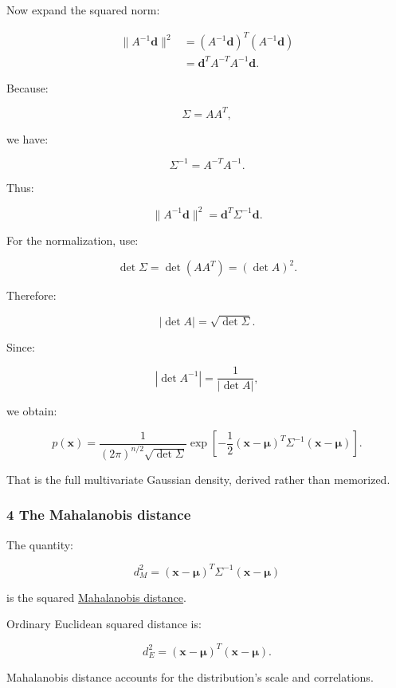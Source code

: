Now expand the squared norm:

\[
 \begin{aligned} \|A^{-1}\mathbf d\|^2 &=(A^{-1}\mathbf d)^T(A^{-1}\mathbf d)\\ &=\mathbf d^TA^{-T}A^{-1}\mathbf d. \end{aligned}
\]

Because:

\[
 \Sigma=AA^T,
\]

we have:

\[
 \Sigma^{-1}=A^{-T}A^{-1}.
\]

Thus:

\[
 \|A^{-1}\mathbf d\|^2 = \mathbf d^T\Sigma^{-1}\mathbf d.
\]

For the normalization, use:

\[
 \det\Sigma= \det(AA^T) =(\det A)^2.
\]

Therefore:

\[
 |\det A|=\sqrt{\det\Sigma}.
\]

Since:

\[
 |\det A^{-1}|=\frac1{|\det A|},
\]

we obtain:

\[
 \boxed{ p(\mathbf x)= \frac1{(2\pi)^{n/2}\sqrt{\det\Sigma}} \exp\left[ -\frac12(\mathbf x-\boldsymbol\mu)^T \Sigma^{-1}(\mathbf x-\boldsymbol\mu) \right] }.
\]

That is the full multivariate Gaussian density, derived rather than memorized.

\subsubsection{4 The Mahalanobis distance}\label{02-foundations-ii-ch024-the-mahalanobis-distance}

\hypertarget{02-foundations-ii-ch024-the-mahalanobis-distance}{}

The quantity:

\[
 \boxed{ d_M^2= (\mathbf x-\boldsymbol\mu)^T \Sigma^{-1} (\mathbf x-\boldsymbol\mu) }
\]

is the squared \hyperref[02-foundations-ii-ch024-waiting-times-event-counts-and-covariance-geometry]{Mahalanobis distance}.

Ordinary Euclidean squared distance is:

\[
 d_E^2= (\mathbf x-\boldsymbol\mu)^T (\mathbf x-\boldsymbol\mu).
\]

Mahalanobis distance accounts for the distribution's scale and correlations.

